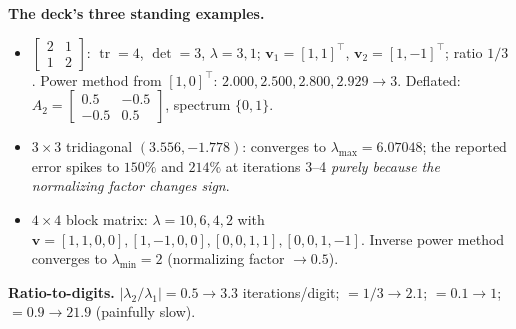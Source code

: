 \begin{numbox}
\textbf{The deck's three standing examples.}
\begin{itemize}
\item $\begin{bmatrix}2&1\\1&2\end{bmatrix}$: $\operatorname{tr}=4$, $\det=3$, $\lambda = 3, 1$; $\mathbf v_1 = [1,1]^\top$, $\mathbf v_2 = [1,-1]^\top$; ratio $1/3$. Power method from $[1,0]^\top$: $2.000, 2.500, 2.800, 2.929 \to 3$. Deflated: $A_2 = \begin{bmatrix}0.5&-0.5\\-0.5&0.5\end{bmatrix}$, spectrum $\{0,1\}$.
\item $3\times3$ tridiagonal $(3.556, -1.778)$: converges to $\lambda_{\max} = 6.07048$; the reported error spikes to $150\%$ and $214\%$ at iterations 3--4 \emph{purely because the normalizing factor changes sign}.
\item $4\times4$ block matrix: $\lambda = 10, 6, 4, 2$ with $\mathbf v = [1,1,0,0], [1,-1,0,0], [0,0,1,1], [0,0,1,-1]$. Inverse power method converges to $\lambda_{\min}=2$ (normalizing factor $\to 0.5$).
\end{itemize}

\smallskip
\textbf{Ratio-to-digits.} $|\lambda_2/\lambda_1| = 0.5 \to 3.3$ iterations/digit; $=1/3 \to 2.1$; $=0.1 \to 1$; $=0.9 \to 21.9$ (painfully slow).
\end{numbox}

